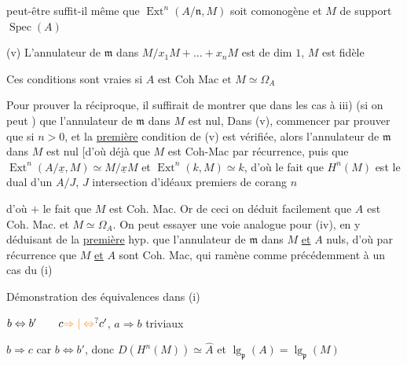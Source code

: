 
peut-être suffit-il même que $\operatorname{Ext}^n(A/\mathfrak n,M)$ soit comonogène et $M$ de support $\operatorname{Spec}(A)$

(v) L'annulateur de $\mathfrak m$ dans $M/x_1M+\ldots+x_nM$ est de dim $1$, $M$ est fidèle

Ces conditions sont vraies si $\boxed{A\text{ est Coh Mac et }M\simeq\Omega_A}$

Pour prouver la réciproque, il suffirait de montrer que dans les cas  à iii) (si on peut ) que  l'annulateur de $\mathfrak m$ dans $M$ est nul,  Dans (v),   commencer par prouver que si $n>0$, et la \uline{première} condition de (v) est vérifiée, alors l'annulateur de $\mathfrak m$ dans $M$ est nul [d'où déjà que $M$ est Coh-Mac par récurrence, puis que $\operatorname{Ext}^n(A/\underline{x},M)\simeq M/\underline{x}M$ et $\operatorname{Ext}^n(k,M)\simeq k$, d'où le fait que $H^n(M)$ est le dual d'un $A/J$, $J$ intersection d'idéaux premiers de corang $n$

d'où   $+$ le fait que $M$ est Coh. Mac. Or de ceci on déduit facilement que $A$ est Coh. Mac. et $M\simeq\Omega_A$. On peut essayer une voie analogue pour (iv), en y déduisant de la \uline{première} hyp.  que l'annulateur de $\mathfrak m$ dans $M$ \uline{et} $A$  nuls, d'où par récurrence que $M$ \uline{et} $A$ sont Coh. Mac,  qui ramène comme précédemment à un cas du (i)

Démonstration des équivalences dans (i)

$b\Leftrightarrow b'\qquad c\unsure{\Rightarrow|\Leftrightarrow}c'$, \qquad $a\Rightarrow b$ \deleted{\unsure{$\Rightarrow$}} triviaux

$b\Rightarrow c$ car $b\Leftrightarrow b'$, donc $D(H^n(M))\simeq\widehat A$ et $\lg_{\mathfrak p}(A)=\lg_{\mathfrak p}(M)$

